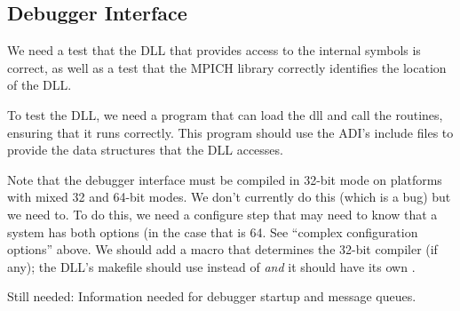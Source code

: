 \documentclass{article}
\begin{document}
\subsection{Debugger Interface}
\label{sec:debug-interface}
We need a test that the DLL that provides access to the internal
symbols is correct, as well as a test that the MPICH library correctly
identifies the location of the DLL.

To test the DLL, we need a program  that can
load the dll and call the routines, ensuring that it runs correctly.
This program should use the ADI's include files to provide the data
structures that the DLL accesses.

Note that the debugger interface must be compiled in 32-bit mode on
platforms with mixed 32 and 64-bit modes.  We don't currently do this
(which is a bug) but we need to.  To do this, we need a configure step
that may need to know that a system has both options (in the case that
 is 64.  See ``complex configuration
options'' above.  We should add a macro  that
determines the 32-bit compiler (if any); the DLL's makefile should use
 instead of  \emph{and} it should have its own
. 

Still needed: Information needed for debugger startup and message
queues.




\end{document}
